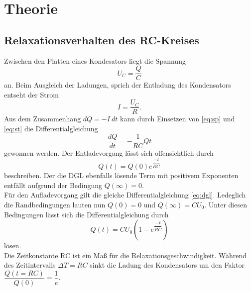 \section{Theorie}
\label{sec:Theorie}

\subsection{Relaxationsverhalten des RC-Kreises}
    Zwischen den Platten eines Kondesators liegt die Spannung 
    \begin{equation}
        \label{eq:sp}
        U_C = \dfrac{Q}{C}
    \end{equation} an.
    Beim Ausgleich der Ladungen, sprich der Entladung des Kondensators entseht der 
    Strom 
    \begin{equation}
        \label{eq:st}
        I = \dfrac{U_C}{R}.
    \end{equation}
    Aus dem Zusammenhang $dQ=-I\ dt$ kann durch Einsetzen von \ref{eq:sp} und \ref{eq:st}
    die Differentialgleichung 
    \begin{equation}
        \dfrac{dQ}{dt}= -\dfrac{1}{RC} Q{t}
    \end{equation}
    gewonnen werden. Der Entladevorgang lässt sich offensichtlich durch 
    \begin{equation}
        \label{eq:dgl}
        Q(t)=Q(0)e^{\dfrac{-t}{RC}}
    \end{equation}
    beschreiben. Der die DGL ebenfalls lösende Term mit positivem Exponenten entfällt aufgrund der 
    Bedingung $Q(\infty)=0$.\\
    Für den Aufladevorgang gilt die gleiche Differentialgleichung \ref{eq:dgl}. Ledeglich die
    Randbedingungen lauten nun $Q(0)=0$ und $Q(\infty)=CU_0$. Unter diesen Bedingungen lässt sich 
    die Differentialgleichung durch 
    \begin{equation}
        Q(t) = CU_0(1-e^{\dfrac{-t}{RC}})
    \end{equation}
    lösen.\\
    Die Zeitkonstante RC ist ein Maß für die Relaxationsgeschwindigkeit. Während des 
    Zeitintervalls $\Delta T=RC$ sinkt die Ladung des Kondensators um den Faktor
    $\dfrac{Q(t=RC)}{Q(0)}=\dfrac{1}{e}$.

